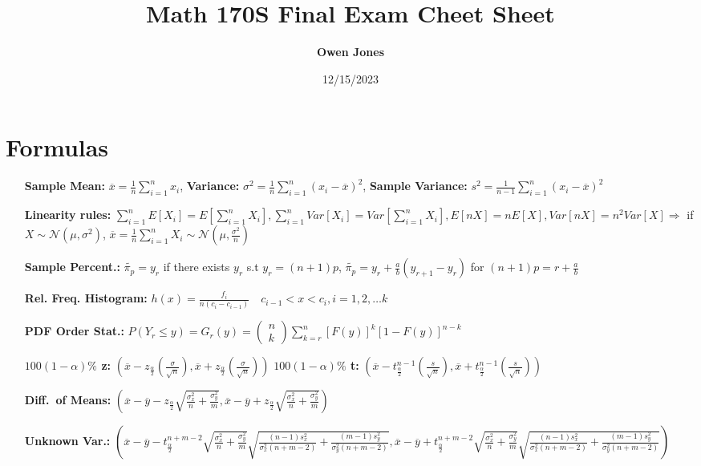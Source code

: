 \documentclass[10pt]{article}
\title{\bf Math 170S Final Exam Cheet Sheet}
\date{12/15/2023}
\author{\bf Owen Jones}
\begin{document}
\maketitle
\section{Formulas}
        \begin{enumerate}
            \item [\bf Sample Mean:] $\overline{x}=\frac{1}{n}\sum_{i=1}^{n}x_i$, \textbf{Variance:} $\sigma^2=\frac{1}{n}\sum_{i=1}^{n}{(x_i-\overline{x})}^2$, \textbf{Sample Variance:} $s^2=\frac{1}{n-1}\sum_{i=1}^{n}{(x_i-\overline{x})}^2$
            \item [\bf Linearity rules:] $\sum_{i=1}^{n}E[X_i]=E[\sum_{i=1}^{n}X_i],\sum_{i=1}^{n}Var[X_i]=Var[\sum_{i=1}^{n}X_i],E[nX]=nE[X],Var[nX]=n^2Var[X]\Rightarrow$ if $X\sim\mathcal{N}(\mu,\sigma^2)$, $\overline{x}=\frac{1}{n}\sum_{i=1}^{n}X_i\sim\mathcal{N}(\mu,\frac{\sigma^2}{n})$
            \item [\bf Sample Percent.:] $\tilde{\pi_p}=y_r$ if there exists $y_r$ s.t $y_r=(n+1)p$, $\tilde{\pi_p}=y_r+\frac{a}{b}(y_{r+1}-y_r)$ for $(n+1)p=r+\frac{a}{b}$
            \item [\bf Rel. Freq. Histogram:] $h(x)=\frac{f_i}{n(c_i-c_{i-1})}\quad c_{i-1}<x<c_i,i=1,2,\ldots k$ 
            \item [\bf PDF Order Stat.:] $P(Y_r\le y)=G_r(y)=\begin{pmatrix}n\\k\end{pmatrix}\sum_{k=r}^{n}{[F(y)]}^k{[1-F(y)]}^{n-k}$
            \item [\bf $100(1-\alpha)\%$ z:] $(\overline{x}-z_\frac{\alpha}{2}(\frac{\sigma}{\sqrt{n}}),\overline{x}+z_\frac{\alpha}{2}(\frac{\sigma}{\sqrt{n}}))$ \textbf{$100(1-\alpha)\%$ t:} $(\overline{x}-t^{n-1}_\frac{\alpha}{2}(\frac{s}{\sqrt{n}}),\overline{x}+t^{n-1}_\frac{\alpha}{2}(\frac{s}{\sqrt{n}}))$\\
            \item [\bf Diff.\ of Means:] $(\overline{x}-\overline{y}-z_\frac{\alpha}{2}\sqrt{\frac{\sigma_x^2}{n}+\frac{\sigma^2_y}{m}},\overline{x}-\overline{y}+z_\frac{\alpha}{2}\sqrt{\frac{\sigma_x^2}{n}+\frac{\sigma^2_y}{m}})$
            \item [\bf Unknown Var.:] $(\overline{x}-\overline{y}-t^{n+m-2}_\frac{\alpha}{2}\sqrt{\frac{\sigma_x^2}{n}+\frac{\sigma^2_y}{m}}\sqrt{\frac{(n-1)s_x^2}{\sigma_x^2(n+m-2)}+\frac{(m-1)s_y^2}{\sigma_y^2(n+m-2)}},\overline{x}-\overline{y}+t^{n+m-2}_\frac{\alpha}{2}\sqrt{\frac{\sigma_x^2}{n}+\frac{\sigma^2_y}{m}}\sqrt{\frac{(n-1)s_x^2}{\sigma_x^2(n+m-2)}+\frac{(m-1)s_y^2}{\sigma_y^2(n+m-2)}})$

\end{enumerate}
\end{document}
